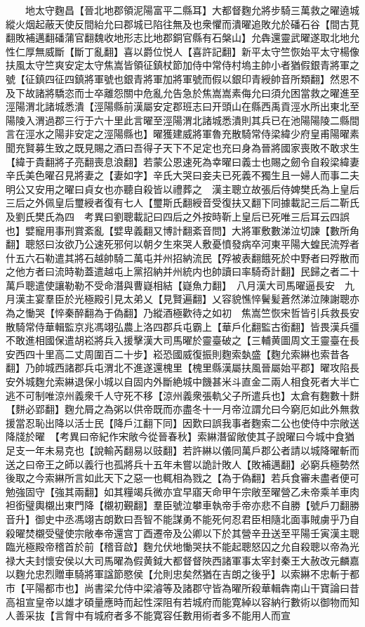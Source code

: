 　　地太守麴昌【晉北地郡領泥陽富平二縣耳】大都督麴允將步騎三萬救之曜遶城縱火烟起蔽天使反間紿允曰郡城已陷往無及也衆懼而潰曜追敗允於磻石谷【間古莧翻敗補邁翻磻蒲官翻魏收地形志比地郡銅官縣有石槃山】允犇還靈武曜遂取北地允性仁厚無威斷【斷丁亂翻】喜以爵位悦人【喜許記翻】新平太守竺恢始平太守楊像扶風太守竺爽安定太守焦嵩皆領征鎮杖節加侍中常侍村塢主帥小者猶假銀青將軍之號【征鎮四征四鎮將軍號也銀青將軍加將軍號而假以銀印青綬帥音所類翻】然恩不及下故諸將驕恣而士卒離怨關中危亂允告急於焦嵩嵩素侮允曰須允困當救之曜進至涇陽渭北諸城悉潰【涇陽縣前漢屬安定郡班志曰开頭山在縣西禹貢涇水所出東北至陽陵入渭過郡三行于六十里此言曜至涇陽渭北諸城悉潰則其兵已在池陽陽陵二縣間言在涇水之陽非安定之涇陽縣也】曜獲建威將軍魯充散騎常侍梁緯少府皇甫陽曜素聞充賢募生致之既見賜之酒曰吾得子天下不足定也充曰身為晉將國家喪敗不敢求生【緯于貴翻將子亮翻喪息浪翻】若蒙公恩速死為幸曜曰義士也賜之劒令自殺梁緯妻辛氏美色曜召見將妻之【妻如字】辛氏大哭曰妾夫已死義不獨生且一婦人而事二夫明公又安用之曜曰貞女也亦聽自殺皆以禮葬之　漢主聰立故張后侍婢樊氏為上皇后三后之外佩皇后璽綬者復有七人【璽斯氏翻綬音受復扶又翻下同據載記三后二靳氏及劉氏樊氏為四　考異曰劉聰載記曰四后之外按時靳上皇后已死唯三后耳云四誤也】嬖寵用事刑賞紊亂【嬖卑義翻又博計翻紊音問】大將軍敷數涕泣切諫【數所角翻】聰怒曰汝欲乃公速死邪何以朝夕生來哭人敷憂憤發病卒河東平陽大蝗民流殍者什五六石勒遣其將石越帥騎二萬屯并州招納流民【殍被表翻餓死於中野者曰殍散而之他方者曰流時勒蓋遣越屯上黨招納并州統内也帥讀曰率騎奇計翻】民歸之者二十萬戶聰遣使讓勒勒不受命潛與曹嶷相結【嶷魚力翻】　八月漢大司馬曜逼長安　九月漢主宴羣臣於光極殿引見太弟乂【見賢遍翻】乂容貌憔悴鬢髪蒼然涕泣陳謝聰亦為之慟哭【悴秦醉翻為于偽翻】乃縱酒極歡待之如初　焦嵩竺恢宋哲皆引兵救長安散騎常侍華輯監京兆馮翊弘農上洛四郡兵屯霸上【華戶化翻監古銜翻】皆畏漢兵彊不敢進相國保遣胡崧將兵入援擊漢大司馬曜於靈臺破之【三輔黄圖周文王靈臺在長安西四十里高二丈周圍百二十步】崧恐國威復振則麴索埶盛【麴允索綝也索昔各翻】乃帥城西諸郡兵屯渭北不進遂還槐里【槐里縣漢屬扶風晉屬始平郡】曜攻陷長安外城麴允索綝退保小城以自固内外斷絶城中饑甚米斗直金二兩人相食死者大半亡逃不可制唯涼州義衆千人守死不移【涼州義衆張軌父子所遣兵也】太倉有麴數十䴵【䴵必郢翻】麴允屑之為粥以供帝既而亦盡冬十一月帝泣謂允曰今窮厄如此外無救援當忍恥出降以活士民【降戶江翻下同】因歎曰誤我事者麴索二公也使侍中宗敞送降牋於曜　【考異曰帝紀作宋敞今從晉春秋】索綝潛留敞使其子說曜曰今城中食猶足支一年未易克也【說輸芮翻易以豉翻】若許綝以儀同萬戶郡公者請以城降曜斬而送之曰帝王之師以義行也孤將兵十五年未嘗以詭計敗人【敗補邁翻】必窮兵極勢然後取之今索綝所言如此天下之惡一也輒相為戮之【為于偽翻】若兵食審未盡者便可勉強固守【強其兩翻】如其糧竭兵微亦宜早寤天命甲午宗敞至曜營乙未帝乘羊車肉袒銜璧輿櫬出東門降【櫬初覲翻】羣臣號泣攀車執帝手帝亦悲不自勝【號戶刀翻勝音升】御史中丞馮翊吉朗歎曰吾智不能謀勇不能死何忍君臣相隨北面事賊虜乎乃自殺曜焚櫬受璧使宗敞奉帝還宫丁酉遷帝及公卿以下於其營辛丑送至平陽壬寅漢主聰臨光極殿帝稽首於前【稽音啟】麴允伏地慟哭扶不能起聰怒囚之允自殺聰以帝為光禄大夫封懷安侯以大司馬曜為假黄鉞大都督督陜西諸軍事太宰封秦王大赦改元麟嘉以麴允忠烈贈車騎將軍諡節愍侯【允則忠矣然猶在吉朗之後乎】以索綝不忠斬于都市【平陽都市也】尚書梁允侍中梁濬等及諸郡守皆為曜所殺華輯犇南山干寶論曰昔高祖宣皇帝以雄才碩量應時而起性深阻有若城府而能寛綽以容納行數術以御物而知人善采抜【言胷中有城府者多不能寛容任數用術者多不能用人而宣
